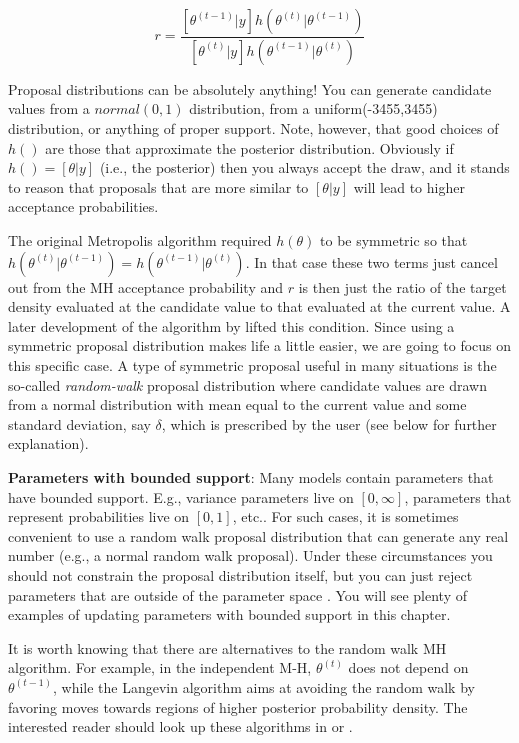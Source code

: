 \[
r = \frac{ [\theta^{(t-1)}|y] h(\theta^{(t)}|\theta^{(t-1)})}
    {[\theta^{(t)}|y] h(\theta^{(t-1)}|\theta^{(t)}) }
\]

Proposal distributions can be absolutely
anything!  You can generate candidate values from a $normal(0,1)$
distribution, from a uniform(-3455,3455) distribution, or anything of
proper support.  Note, however, that good choices of $h()$ are those
that approximate the posterior distribution. Obviously if $h() =
[\theta|y]$ (i.e., the posterior) then you always accept the draw,
and it stands to reason that proposals that are more similar to
$[\theta|y]$ will lead to higher acceptance probabilities. 

The original Metropolis algorithm
required $h(\theta)$ to be symmetric so that
$h(\theta^{(t)}|\theta^{(t-1)}) = h(\theta^{(t-1)}|\theta^{(t)})$. 
In that case these two terms just cancel
out from the MH acceptance probability and $r$ is then just the ratio
of the target density evaluated at the candidate value to that
evaluated at the current value. A later
development of the algorithm by \citet{hastings:1970} lifted this
condition. 
Since using a symmetric proposal distribution makes life a little
easier, we are going to focus on this specific case. A type of symmetric proposal useful in many situations is the
so-called {\it random-walk} proposal distribution where candidate values
are drawn from a normal distribution with mean equal to the current
value and some standard deviation, say $\delta$, which is prescribed by
the user (see below for further explanation). 

{\bf Parameters with bounded support}: Many models contain parameters that
have  bounded support. E.g., variance parameters live on $[0,\infty]$,
parameters that represent probabilities live on $[0,1]$, etc..
For such cases, it is sometimes convenient to use a random
walk proposal distribution that can generate any real number (e.g., a
normal random walk proposal). Under these circumstances you should not constrain the proposal distribution itself, 
but you can just reject parameters that are
outside of the parameter space \citep{robert_casella:2010}. You will see plenty of examples of updating parameters with bounded support in this chapter. 

It is worth
knowing that there are alternatives to the random walk MH algorithm. For
example, in the independent M-H, $\theta^{(t)}$ does not depend on
$\theta^{(t-1)}$, while the Langevin algorithm \citep{roberts_etal:1998}
aims at avoiding the random walk by favoring moves towards regions of
higher posterior probability density. The interested reader should
look up these algorithms in \citet{robert_casella:2004} or
\citet{robert_casella:2010}.

